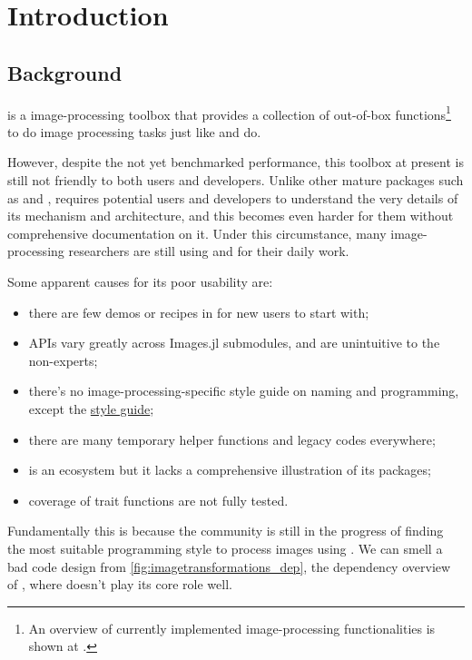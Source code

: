 
\section{Introduction}\label{sec:project}

\subsection{Background}

\repoimages{} is a \langjulia image-processing toolbox that provides a collection of out-of-box functions\footnote{An overview of currently implemented image-processing functionalities is shown at \apicomparison.} to do image processing tasks just like \reposcikitimage{} and \matlabimageprocessing{} do.

However, despite the not yet benchmarked performance, this toolbox at present is still not friendly to both users and developers. Unlike other mature \langjulia{} packages such as \repojump and \repogpuarrays, \images{} requires potential users and developers to understand the very details of its mechanism and architecture, and this becomes even harder for them without comprehensive documentation on it. Under this circumstance, many image-processing researchers are still using \langpython and \langmatlab for their daily work.

Some apparent causes for its poor usability are:
{\normalsize
\begin{itemize}
    \item there are few demos or recipes in \images{} for new users to start with;
    \item APIs vary greatly across Images.jl submodules, and are unintuitive to the non-experts;
    \item there's no image-processing-specific style guide on naming and programming, except the \langjulia{} \href{https://docs.julialang.org/en/v1/manual/style-guide/}{style guide};
    \item there are many temporary helper functions and legacy codes everywhere;
    \item \images{} is an ecosystem but it lacks a comprehensive illustration of its packages;
    \item coverage of trait functions are not fully tested.
\end{itemize}
}
Fundamentally this is because the community is still in the progress of finding the most suitable programming style to process images using \langjulia. We can smell a bad code design from \cref{fig:imagetransformations_dep}, the dependency overview of \imagetransformations{}, where \imagecore{} doesn't play its core role well.

